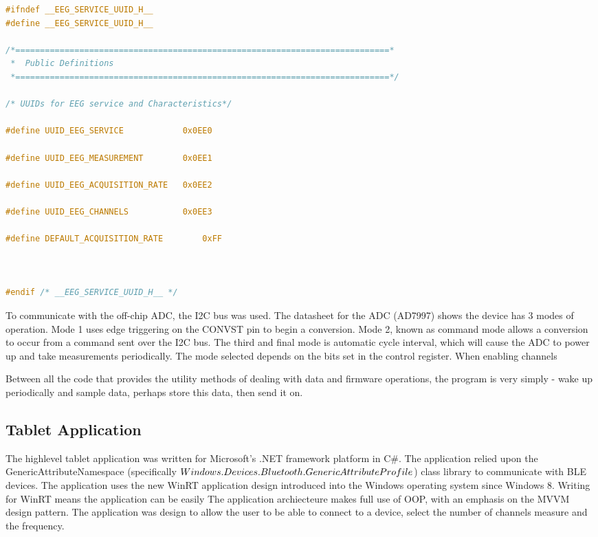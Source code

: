 \documentclass[]{article}
\begin{document}
\begin{lstlisting}[language=C, caption=UUIDs EEG service,label={lst:eeguuid}]
#ifndef __EEG_SERVICE_UUID_H__
#define __EEG_SERVICE_UUID_H__

/*============================================================================*
 *  Public Definitions
 *============================================================================*/

/* UUIDs for EEG service and Characteristics*/

#define UUID_EEG_SERVICE			0x0EE0

#define UUID_EEG_MEASUREMENT		0x0EE1

#define UUID_EEG_ACQUISITION_RATE	0x0EE2

#define UUID_EEG_CHANNELS			0x0EE3

#define DEFAULT_ACQUISITION_RATE		0xFF



#endif /* __EEG_SERVICE_UUID_H__ */
\end{lstlisting}


To communicate with the off-chip \ac{ADC}, the I2C bus was used. The datasheet for the \ac{ADC} (AD7997) \cite{ad7997} shows the device has 3 modes of operation. Mode 1 uses edge triggering on the CONVST pin to begin a conversion. Mode 2, known as command mode allows a conversion to occur from a command sent over the I2C bus. The third and final mode is automatic cycle interval, which will cause the \ac{ADC} to power up and take measurements periodically. The mode selected depends on the bits set in the control register. When enabling channels 

Between all the code that provides the utility methods of dealing with data and firmware operations, the program is very simply - wake up periodically and sample data, perhaps store this data, then send it on. 






\subsection{Tablet Application}

The highlevel tablet application was written for Microsoft's .NET framework platform in C\#. The application relied upon the GenericAttributeNamespace (specifically $Windows.Devices.\\Bluetooth.GenericAttributeProfile$) class library to communicate with \ac{BLE} devices. The application uses the new WinRT application design introduced into the Windows operating system since Windows 8. Writing for WinRT means the application can be easily The application archiecteure makes full use of \ac{OOP}, with an emphasis on the \ac{MVVM} design pattern. The application was design to allow the user to be able to connect to a device, select the number of channels measure and the frequency. 
\end{document}
